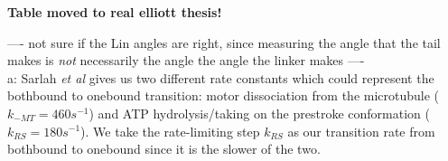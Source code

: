 \documentclass[10pt]{article} %
\begin{document}

\textbf{Table moved to real elliott thesis!}

---- not sure if the Lin angles are right, since measuring the angle that the tail makes is \textit{not} necessarily the angle the angle the linker makes ----\\

a: Sarlah \textit{et al} gives us two different rate constants which could represent the bothbound to onebound transition: motor dissociation from the microtubule ($k_{-MT} = 460 s^{-1}$) and ATP hydrolysis/taking on the prestroke conformation ($k_{RS} = 180 s^{-1}$). We take the rate-limiting step $k_{RS}$ as our transition rate from bothbound to onebound since it is the slower of the two.\\
\end{document}
